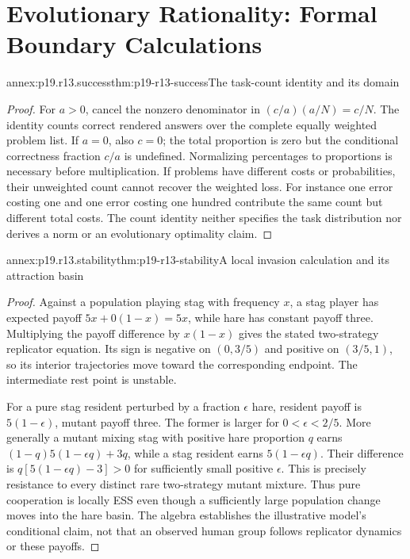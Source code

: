 \section{Evolutionary Rationality: Formal Boundary Calculations}
\label{sec:annex-p19-rationality-1-3}

\begin{annexitem}{annex:p19.r13.success}{thm:p19-r13-success}{The task-count identity and its domain}
\begin{proof}
For \(a>0\), cancel the nonzero denominator in
\((c/a)(a/N)=c/N\). The identity counts correct rendered answers over
the complete equally weighted problem list. If \(a=0\), also \(c=0\);
the total proportion is zero but the conditional correctness fraction
\(c/a\) is undefined. Normalizing percentages to proportions is necessary
before multiplication. If problems have different costs or probabilities,
their unweighted count cannot recover the weighted loss. For instance one
error costing one and one error costing one hundred contribute the same
count but different total costs. The count identity neither specifies the
task distribution nor derives a norm or an evolutionary optimality claim.
\end{proof}\end{annexitem}

\begin{annexitem}{annex:p19.r13.stability}{thm:p19-r13-stability}{A local invasion calculation and its attraction basin}
\begin{proof}
Against a population playing stag with frequency \(x\), a stag player
has expected payoff \(5x+0(1-x)=5x\), while hare has constant payoff
three. Multiplying the payoff difference by \(x(1-x)\) gives the stated
two-strategy replicator equation. Its sign is negative on \((0,3/5)\)
and positive on \((3/5,1)\), so its interior trajectories move toward
the corresponding endpoint. The intermediate rest point is unstable.

For a pure stag resident perturbed by a fraction \(\epsilon\) hare,
resident payoff is \(5(1-\epsilon)\), mutant payoff three. The former
is larger for \(0<\epsilon<2/5\). More generally a mutant mixing stag
with positive hare proportion \(q\) earns
\((1-q)5(1-\epsilon q)+3q\), while a stag resident earns
\(5(1-\epsilon q)\). Their difference is
\(q[5(1-\epsilon q)-3]>0\) for sufficiently small positive
\(\epsilon\). This is precisely resistance to every distinct rare
two-strategy mutant mixture. Thus pure cooperation is locally ESS even
though a sufficiently large population change moves into the hare basin.
The algebra establishes the illustrative model's conditional claim, not
that an observed human group follows replicator dynamics or these payoffs.
\end{proof}\end{annexitem}

